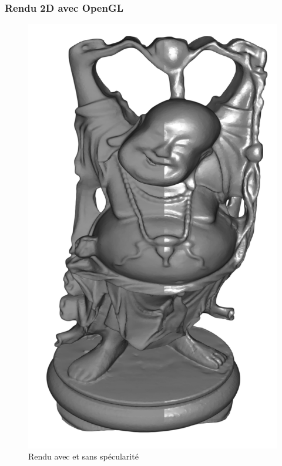 \documentclass{beamer}
\begin{document}
\begin{frame}
\frametitle{Rendu 2D avec OpenGL}
\begin{figure}
\centering
\includegraphics[scale=0.15]{rendu_specular.png}
\caption{Rendu avec et sans spécularité}
\end{figure}

\end{frame}

\end{document}
